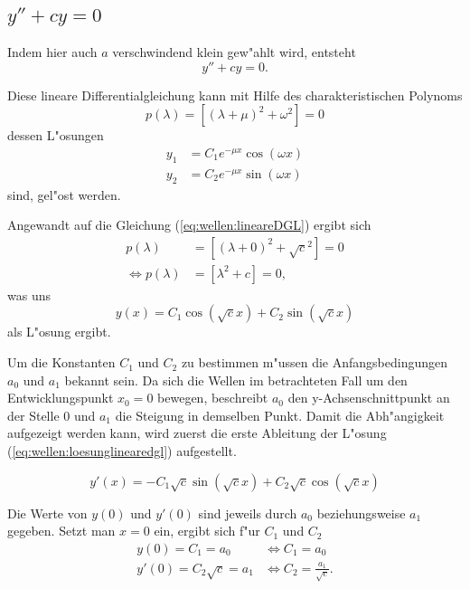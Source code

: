 \subsection{\texorpdfstring{$y''+cy = 0$}{y''+cy = 0}}
Indem hier auch $a$ verschwindend klein gew"ahlt wird, entsteht
\begin{equation}
	y''+ cy = 0.
	\label{eq:wellen:lineareDGL}
\end{equation}

Diese lineare Differentialgleichung kann mit Hilfe des charakteristischen 
Polynoms
\begin{equation*}
	p(\lambda) = [(\lambda+\mu)^2+\omega^2] = 0
\end{equation*}
dessen L"osungen
\begin{equation*}
	\begin{split}
		y_1 &= C_1e^{-\mu x}\cos(\omega x) \\
		y_2 &= C_2e^{-\mu x}\sin(\omega x)
	\end{split}
\end{equation*}
sind, gel"ost werden.

Angewandt auf die Gleichung (\ref{eq:wellen:lineareDGL}) ergibt sich
\begin{equation*}
	\begin{split}
		p(\lambda) &= [(\lambda+0)^2+\sqrt{c}^2] = 0 \\
		\Leftrightarrow p(\lambda) &= [\lambda^2+c] = 0,
	\end{split}
\end{equation*}
was uns
\begin{equation}
	y(x) = C_1 \cos(\sqrt{c}x) + C_2 \sin(\sqrt{c}x)
	\label{eq:wellen:loesunglinearedgl}
\end{equation}
als L"osung ergibt.

Um die Konstanten $C_1$ und $C_2$ zu bestimmen m"ussen die Anfangsbedingungen 
$a_0$ und $a_1$ bekannt sein. Da sich die Wellen im betrachteten Fall um den 
Entwicklungspunkt $x_0=0$ bewegen, beschreibt $a_0$ den y-Achsenschnittpunkt an 
der Stelle $0$ und $a_1$ die Steigung in demselben Punkt. Damit die 
Abh"angigkeit aufgezeigt werden kann, wird zuerst die erste Ableitung der 
L"osung (\ref{eq:wellen:loesunglinearedgl}) aufgestellt.

\begin{equation}
	y'(x)=-C_1 \sqrt{c} \sin(\sqrt{c}x) + C_2 \sqrt{c} \cos(\sqrt{c}x)
\end{equation}

Die Werte von $y(0)$ und $y'(0)$ sind jeweils durch $a_0$ beziehungsweise $a_1$ 
gegeben. Setzt man $x = 0$ ein, ergibt sich f"ur $C_1$ und $C_2$
\begin{equation}
	\begin{split}
		y(0) = C_1 = a_0 &\Leftrightarrow C_1 = a_0 \\
		y'(0) = C_2 \sqrt{c} = a_1 &\Leftrightarrow C_2 = \frac{a_1}{\sqrt{c}}.
	\end{split}
\end{equation}

